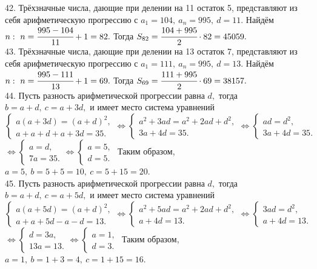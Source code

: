 \documentclass[12pt]{article}
\begin{document}
42. Трёхзначные числа, дающие при делении на 11 остаток 5, представляют из себя арифметическую прогрессию с $a_1=104,\ a_n=995,\ d=11.$ Найдём $n:\ n=\cfrac{995-104}{11}+1=82.$ Тогда $S_{82}=\cfrac{104+995}{2}\cdot82=45059.$\\
43. Трёхзначные числа, дающие при делении на 13 остаток 7, представляют из себя арифметическую прогрессию с $a_1=111,\ a_n=995,\ d=13.$ Найдём $n:\ n=\cfrac{995-111}{13}+1=69.$ Тогда $S_{69}=\cfrac{111+995}{2}\cdot69=38157.$\\
44. Пусть разность арифметической прогрессии равна $d,$ тогда $b=a+d,\ c=a+3d,$ и имеет место система уравнений
$\begin{cases} a(a+3d)=(a+d)^2,\\ a+a+d+a+3d=35.\end{cases}\Leftrightarrow\begin{cases} a^2+3ad=a^2+2ad+d^2,\\ 3a+4d=35.\end{cases}\Leftrightarrow
\begin{cases} ad=d^2,\\ 3a+4d=35.\end{cases}$\\$\Leftrightarrow\begin{cases} a=d,\\ 7a=35.\end{cases}
\Leftrightarrow\begin{cases} a=5,\\ d=5.\end{cases}$ Таким образом, $a=5,\ b=5+5=10,\ c=5+15=20.$\\
45. Пусть разность арифметической прогрессии равна $d,$ тогда $b=a+d,\ c=a+5d,$ и имеет место система уравнений
$\begin{cases} a(a+5d)=(a+d)^2,\\ a+a+5d-a-d=13.\end{cases}\Leftrightarrow\begin{cases} a^2+5ad=a^2+2ad+d^2,\\ a+4d=13.\end{cases}\Leftrightarrow
\begin{cases} 3ad=d^2,\\ a+4d=13.\end{cases}$\\$\Leftrightarrow\begin{cases} d=3a,\\ 13a=13.\end{cases}
\Leftrightarrow\begin{cases} a=1,\\ d=3.\end{cases}$ Таким образом, $a=1,\ b=1+3=4,\ c=1+15=16.$\\
\end{document}
